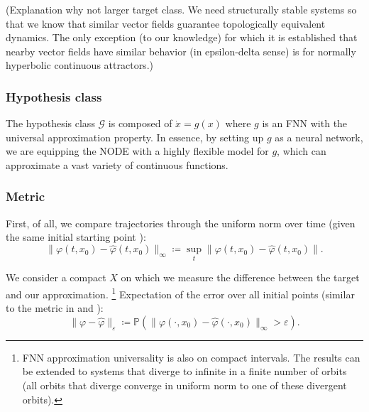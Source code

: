 \documentclass{article}
\newcommand{\ascomment}[1]{\textcolor{ascolor}{(#1)}}
\theoremstyle{definition} \newtheorem{definition}{Definition}
\theoremstyle{remark} \newtheorem{remark}{Remark}
\newcommand{\vol}{\operatorname{vol}}
\newcounter{ct}
\begin{document}
\ascomment{Explanation why not larger target class. We need structurally stable systems so that we know that similar vector fields guarantee topologically equivalent dynamics. The only exception (to our knowledge) for which it is established that nearby vector fields have similar behavior (in epsilon-delta sense) is for normally hyperbolic continuous attractors.}

\subsubsection{Hypothesis class}\label{sec:hypothesis}
The hypothesis class $\mathcal{G}$ is composed of $\dot x = g(x)$
where $g$ is an FNN with the universal approximation property. %
In essence, by setting up $g$ as a neural network, we are equipping the NODE with a highly flexible model for $g$, which can approximate a vast variety of continuous functions. 



\subsubsection{Metric}\label{sec:metric}
First, of all, we compare trajectories through the uniform norm over time (given the same initial starting point \citep{girard2007approximation}):
\begin{equation}
\|\varphi(t,x_0)-\hat \varphi(t,x_0)\|_\infty \coloneqq \sup_t\|\varphi(t,x_0)-\hat \varphi(t,x_0)\|.
\end{equation}

We consider a compact $X$ on which we measure the difference between the target and our approximation.
\footnote{FNN approximation universality is also on compact intervals.
The results can be extended to systems that diverge to infinite in a finite number of orbits (all orbits that diverge converge in uniform norm to one of these divergent orbits).}
%
Expectation of the error over all initial points (similar to the metric in \citep{hammer2000approximation} and \citep{hanson2021learning}):
\begin{equation}\label{eq:initerror}
\|\varphi-\hat \varphi\|_\varepsilon \coloneqq  \mathbb{P}\left(\|\varphi(\cdot,x_0)-\hat \varphi(\cdot,x_0)\|_\infty>\varepsilon\right).
\end{equation}
\end{document}
